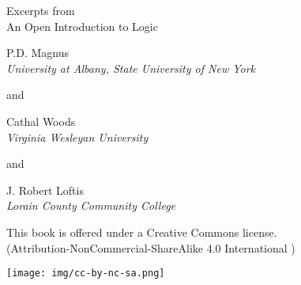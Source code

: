 \setlength{\parindent}{0em}
\thispagestyle{empty}


%

%
{\large Excerpts from}\\
\vfill
{\LARGE An Open Introduction to Logic}\\
\vfill 




\vfill

{\sf P.D. Magnus}\\
\emph{University at Albany, State University of New York}

and

{\sf Cathal Woods}\\
\emph{Virginia Wesleyan University}

and

{\sf J. Robert Loftis}\\
\emph{Lorain County Community College}

\vfill

{\sf
	This book is offered under a Creative Commons license.\\
	(Attribution-NonCommercial-ShareAlike 4.0 International )
}

\texttt{[image: img/cc-by-nc-sa.png]}


